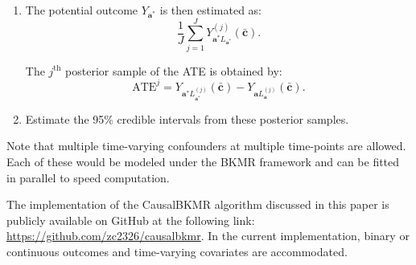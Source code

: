 \begin{enumerate}
\begin{enumerate}
        \item Let the $j^{\text{th}}$ posterior sample of $Y_{\mathbf{a}^* L_{\mathbf{a}^*}}$ be the mean over the $K$ samples:
        \begin{equation*}
            Y_{\mathbf{a}^* L_{\mathbf{a}^*}}^{(j)}(\bar{\mathbf{c}}) = \frac{1}{K} \sum_{k=1}^{K} Y_{\mathbf{a}^* L_{\mathbf{a}^*}}^{(jk)}(\bar{\mathbf{c}}) = E\!\left[Y_{\mathbf{a}^*} \mid \bar{\mathbf{c}}\right].
        \end{equation*}
    \end{enumerate}

    \item The potential outcome $Y_{\mathbf{a}^*}$ is then estimated as:
    \begin{equation*}
        \frac{1}{J} \sum_{j=1}^{J} Y_{\mathbf{a}^* L_{\mathbf{a}^*}}^{(j)}(\bar{\mathbf{c}}).
    \end{equation*}

    The $j^{\text{th}}$ posterior sample of the ATE is obtained by:
    \begin{equation*}
        \text{ATE}^{j} = Y_{\mathbf{a}^* L_{\mathbf{a}^*}^{(j)}}(\bar{\mathbf{c}}) - Y_{\mathbf{a} L_{\mathbf{a}}^{(j)}}(\bar{\mathbf{c}}).
    \end{equation*}

    \item Estimate the 95\% credible intervals from these posterior samples.
\end{enumerate}

Note that multiple time-varying confounders at multiple time-points are allowed. Each of these would be modeled under the BKMR framework and can be fitted in parallel to speed computation.

The implementation of the CausalBKMR algorithm discussed in this paper is publicly available on GitHub at the following link: \url{https://github.com/zc2326/causalbkmr}. In the current implementation, binary or continuous outcomes and time-varying covariates are accommodated.
